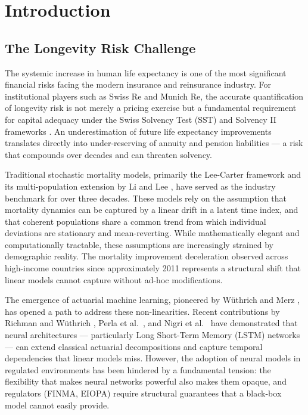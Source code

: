 \documentclass[11pt,a4paper]{article}
\begin{document}
\section{Introduction}

\subsection{The Longevity Risk Challenge}

The systemic increase in human life expectancy is one of the most significant financial risks facing the modern insurance and reinsurance industry. For institutional players such as Swiss Re and Munich Re, the accurate quantification of longevity risk is not merely a pricing exercise but a fundamental requirement for capital adequacy under the Swiss Solvency Test (SST) and Solvency II frameworks \cite{swissre2022}. An underestimation of future life expectancy improvements translates directly into under-reserving of annuity and pension liabilities --- a risk that compounds over decades and can threaten solvency.

Traditional stochastic mortality models, primarily the Lee-Carter framework \cite{leecarter1992} and its multi-population extension by Li and Lee \cite{lilee2005}, have served as the industry benchmark for over three decades. These models rely on the assumption that mortality dynamics can be captured by a linear drift in a latent time index, and that coherent populations share a common trend from which individual deviations are stationary and mean-reverting. While mathematically elegant and computationally tractable, these assumptions are increasingly strained by demographic reality. The mortality improvement deceleration observed across high-income countries since approximately 2011 represents a structural shift that linear models cannot capture without ad-hoc modifications.

The emergence of actuarial machine learning, pioneered by W\"uthrich and Merz \cite{wuthrich2021statistical, wuthrich2023}, has opened a path to address these non-linearities. Recent contributions by Richman and W\"uthrich \cite{richman2021}, Perla et al.\ \cite{perla2021}, and Nigri et al.\ \cite{nigri2019} have demonstrated that neural architectures --- particularly Long Short-Term Memory (LSTM) networks --- can extend classical actuarial decompositions and capture temporal dependencies that linear models miss. However, the adoption of neural models in regulated environments has been hindered by a fundamental tension: the flexibility that makes neural networks powerful also makes them opaque, and regulators (FINMA, EIOPA) require structural guarantees that a black-box model cannot easily provide.
\end{document}
